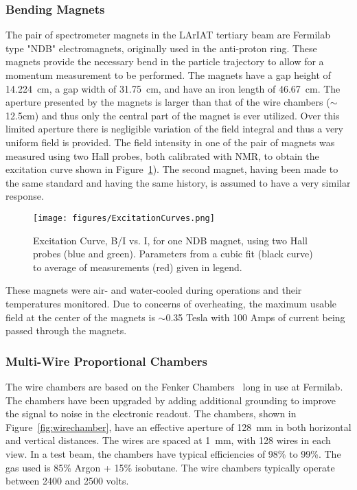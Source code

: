 \subsubsection{Bending Magnets}\label{sec:Magnets}
The pair of spectrometer magnets in the LArIAT tertiary beam are Fermilab type "NDB" electromagnets, originally used in the anti-proton ring. These magnets provide the necessary bend in the particle trajectory to allow for a momentum measurement to be performed.  The magnets have a gap height of 14.224~cm, a gap width of 31.75~cm, and have an iron length of 46.67~cm.  The aperture presented by the magnets is larger than that of the wire chambers ($\sim$12.5cm) and thus only the central part of the magnet is ever utilized.  Over this limited aperture there is negligible variation of the field integral and thus a very uniform field is provided. The field intensity in one of the pair of magnets was measured using two Hall probes, both calibrated with NMR, to obtain the excitation curve shown in Figure~\ref{fig:magnet_excitation}). The second magnet, having been made to the same standard and having the same history, is assumed to have a very similar response.
\begin{figure}[!h]
\begin{centering}
\vspace{-0.3cm}
\texttt{[image: figures/ExcitationCurves.png]}
\caption{
{\scriptsize \sf Excitation Curve, B/I vs. I, for one NDB magnet, using two Hall probes (blue and green). Parameters from a cubic fit (black curve) to average of measurements (red) given in legend.}
}
\label{fig:magnet_excitation}
\end{centering}
\end{figure}

These magnets were air- and water-cooled during operations and their temperatures monitored. Due to concerns of overheating, the maximum usable field at the center of the magnets is $\sim$0.35 Tesla with 100 Amps of current being passed through the magnets.

\subsubsection{Multi-Wire Proportional Chambers}\label{sec:MWPC}
The wire chambers are based on the Fenker Chambers~\cite{Fenker} long in use at Fermilab.  The chambers have been upgraded by adding additional grounding to improve the signal to noise in the electronic readout.  The chambers, shown in Figure~\ref{fig:wirechamber}, have an effective aperture of 128~mm in both horizontal and vertical distances.  The wires are spaced at 1~mm, with 128 wires in each view.  In a test beam, the chambers have typical efficiencies of 98\% to 99\%. The gas used is 85\% Argon + 15\% isobutane.  The wire chambers typically operate between 2400 and 2500 volts.

